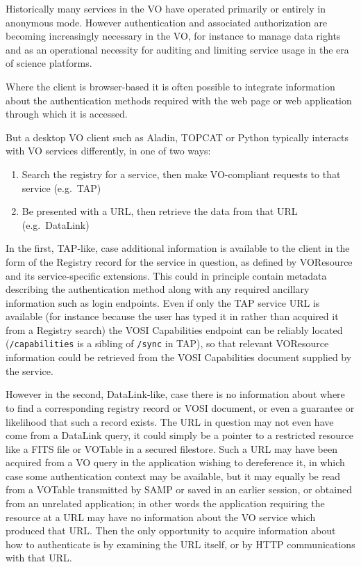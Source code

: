 \documentclass[11pt,a4paper]{ivoa}
\begin{document}
Historically many services in the VO have operated primarily or
entirely in anonymous mode.
However authentication and associated authorization
are becoming increasingly necessary in the VO,
for instance to manage data rights and as an operational necessity for
auditing and limiting service usage in the era of science platforms.

Where the client is browser-based
it is often possible to integrate information about the authentication
methods required with the web page or web application through which
it is accessed.

But a desktop VO client such as Aladin, TOPCAT or Python
typically interacts with VO services differently, in one of two
ways:
\begin{enumerate}
\item Search the registry for a service, then make VO-compliant
      requests to that service (e.g.\ TAP)
\item Be presented with a URL, then retrieve the data from that URL
      (e.g.\ DataLink)
\end{enumerate}
In the first, TAP-like, case additional information is available to the
client in the form of the Registry record for the service in question,
as defined by VOResource and its service-specific extensions.
This could in principle contain metadata describing the authentication
method along with any required ancillary information such as
login endpoints.
Even if only the TAP service URL is available
(for instance because the user has typed it in rather than acquired it
from a Registry search) the VOSI Capabilities endpoint can be reliably
located ({\tt /capabilities} is a sibling of {\tt /sync} in TAP),
so that relevant VOResource information could be retrieved from the VOSI
Capabilities document supplied by the service.

However in the second, DataLink-like, case
there is no information about where to find a corresponding
registry record or VOSI document,
or even a guarantee or likelihood that such a record exists.
The URL in question may not even have come from a DataLink query,
it could simply be a pointer to a restricted resource like a
FITS file or VOTable in a secured filestore.
Such a URL may have been acquired from a VO query in the application
wishing to dereference it, in which case some authentication context
may be available,
but it may equally be read from a VOTable transmitted by SAMP
or saved in an earlier session, or obtained from an unrelated application;
in other words the application requiring the resource at a URL may
have no information about the VO service which produced that URL.
Then the only opportunity to acquire information about how to authenticate
is by examining the URL itself, or by HTTP communications with that URL.
\end{document}
